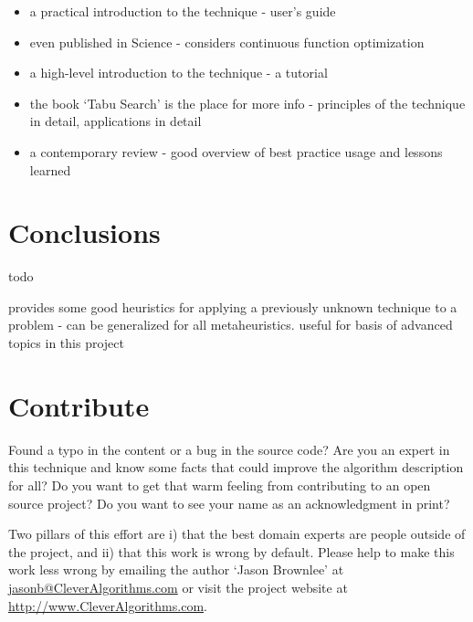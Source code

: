 \documentclass[a4paper, 11pt]{article}
\makeatletter
\newcommand{\myreportauthor}{Jason Brownlee}
\newcommand{\myreportemail}{jasonb@CleverAlgorithms.com}
\newcommand{\myreportwebsite}{http://www.CleverAlgorithms.com}
\makeatother
\begin{document}
\begin{itemize}
	\item a practical introduction to the technique \cite{Glover1993} - user's guide
	\item even published in Science \cite{Cvijovic1995} - considers continuous function optimization
	\item a high-level introduction to the technique \cite{Glover1990a} - a tutorial
	\item the book `Tabu Search' is the place for more info \cite{Glover1998} - principles of the technique in detail, applications in detail
	\item a contemporary review \cite{Gendreau2003} - good overview of best practice usage and lessons learned
\end{itemize}


% 
% 
\section{Conclusions}
\label{sec:conclusions}
todo


\cite{Gendreau2003}  provides some good heuristics for applying a previously unknown technique to a problem - can be generalized for all metaheuristics. useful for basis of advanced topics in this project

% 
% 
\section{Contribute}
\label{sec:contribute}
Found a typo in the content or a bug in the source code? 
Are you an expert in this technique and know some facts that could improve the algorithm description for all?
Do you want to get that warm feeling from contributing to an open source project? 
Do you want to see your name as an acknowledgment in print?

Two pillars of this effort are i) that the best domain experts are people outside of the project, and ii) that this work is wrong by default. 
Please help to make this work less wrong by emailing the author `\myreportauthor' at \url{\myreportemail} or visit the project website at \url{\myreportwebsite}.



\end{document}

